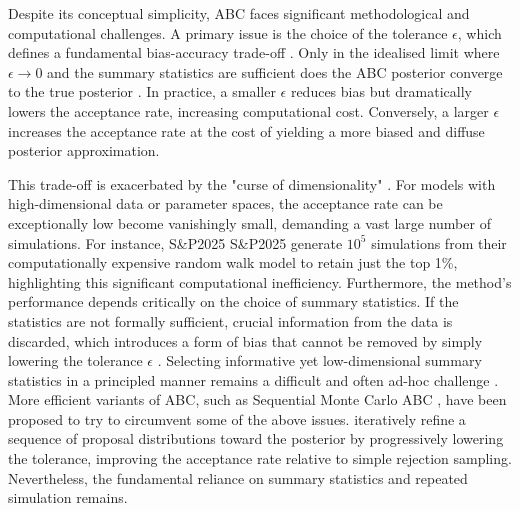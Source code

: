 \documentclass{article}
\newcommand{\SP}{S\&P2025}
\providecommand{\DIFaddtex}[1]{{\protect\color{blue} \sf #1}} %
\providecommand{\DIFdeltex}[1]{{\protect\color{red} \scriptsize #1}} %
\providecommand{\DIFaddbegin}{} %
\providecommand{\DIFaddend}{} %
\providecommand{\DIFdelbegin}{} %
\providecommand{\DIFdelend}{} %
\providecommand{\DIFadd}[1]{\texorpdfstring{\DIFaddtex{#1}}{#1}} %
\providecommand{\DIFdel}[1]{\texorpdfstring{\DIFdeltex{#1}}{}} %
\newcommand{\DIFscaledelfig}{0.5}
\newlength{\DIFdelgraphicswidth} %
\newlength{\DIFdelgraphicsheight} %
\newcommand{\DIFaddincludegraphics}[2][]{{\color{blue}\fbox{\DIFOincludegraphics[#1]{#2}}}} %
\newcommand{\DIFdelincludegraphics}[2][]{%
\sbox{\DIFdelgraphicsbox}{\DIFOincludegraphics[#1]{#2}}%
\settoboxwidth{\DIFdelgraphicswidth}{\DIFdelgraphicsbox} %
\settoboxtotalheight{\DIFdelgraphicsheight}{\DIFdelgraphicsbox} %
\scalebox{\DIFscaledelfig}{%
\parbox[b]{\DIFdelgraphicswidth}{\usebox{\DIFdelgraphicsbox}\\[-\baselineskip] \rule{\DIFdelgraphicswidth}{0em}}\llap{\resizebox{\DIFdelgraphicswidth}{\DIFdelgraphicsheight}{%
\setlength{\unitlength}{\DIFdelgraphicswidth}%
\begin{picture}(1,1)%
\thicklines\linethickness{2pt} %
{\color[rgb]{1,0,0}\put(0,0){\framebox(1,1){}}}%
{\color[rgb]{1,0,0}\put(0,0){\line( 1,1){1}}}%
{\color[rgb]{1,0,0}\put(0,1){\line(1,-1){1}}}%
\end{picture}%
}\hspace*{3pt}}} %
} %
\DeclareRobustCommand{\DIFaddbegin}{\DIFOaddbegin \let\includegraphics\DIFaddincludegraphics} %
\DeclareRobustCommand{\DIFaddend}{\DIFOaddend \let\includegraphics\DIFOincludegraphics} %
\DeclareRobustCommand{\DIFdelbegin}{\DIFOdelbegin \let\includegraphics\DIFdelincludegraphics} %
\DeclareRobustCommand{\DIFdelend}{\DIFOaddend \let\includegraphics\DIFOincludegraphics} %
\begin{document}
Despite its conceptual simplicity, ABC faces significant methodological and computational challenges. A primary issue is the choice of the tolerance $\epsilon$, which defines a fundamental bias-accuracy trade-off \citep{SunnkerABC,Blum2013}. Only in the idealised limit where $\epsilon \to 0$ and the summary statistics are sufficient does the ABC posterior converge to the true posterior \citep{Marin2012,Blum2013}. In practice, a smaller $\epsilon$ reduces bias but dramatically lowers the acceptance rate, increasing computational cost. Conversely, a larger $\epsilon$ increases the acceptance rate at the cost of yielding a more biased and diffuse posterior approximation.

This trade-off is exacerbated by the "curse of dimensionality" \citep{Blum2010,Blum2013}. For models with high-dimensional data or parameter spaces, the acceptance rate can \DIFdelbegin \DIFdel{be exceptionally low}\DIFdelend \DIFaddbegin \DIFadd{become vanishingly small}\DIFaddend , demanding a \DIFdelbegin \DIFdel{vast }\DIFdelend \DIFaddbegin \DIFadd{large }\DIFaddend number of simulations. For instance, \DIFdelbegin \DIFdel{S\&P2025 }\DIFdelend \DIFaddbegin \DIFadd{\SP{} }\DIFaddend generate $10^5$ simulations from their computationally expensive random walk model to retain just the top 1\%, highlighting this significant computational inefficiency. Furthermore, the method's performance depends critically on the choice of summary statistics. If the statistics are not formally sufficient, crucial information from the data is discarded, which introduces a form of bias that cannot be removed by simply lowering the tolerance $\epsilon$ \citep{Robert2011,Marin2012}. Selecting informative yet low-dimensional summary statistics in a principled manner remains a difficult and often ad-hoc challenge \citep{FearnheadPrangle2012,Blum2013}. More efficient variants\DIFdelbegin \DIFdel{of ABC}\DIFdelend , such as Sequential Monte Carlo ABC \citep{SissonFanTanaka2007,ToniWelchStrelkowaIpsenStumpf2009}, \DIFdelbegin \DIFdel{have been proposed to try to circumvent some of the above issues. }\DIFdelend \DIFaddbegin \DIFadd{iteratively refine a sequence of proposal distributions toward the posterior by progressively lowering the tolerance, improving the acceptance rate relative to simple rejection sampling. Nevertheless, the fundamental reliance on summary statistics and repeated simulation remains.
}\DIFaddend 
\end{document}
